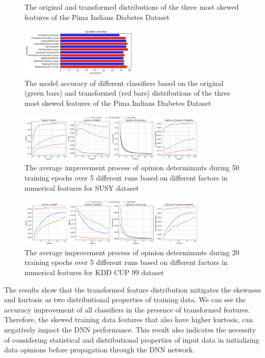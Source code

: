 {\begin{figure}[t]
\vspace{-0.3cm}
\caption{The original and transformed distributions of the three most skewed features of the Pima Indians Diabetes Dataset}
\label{skew_dist}
\end{figure}
\begin{figure}[t]  %
\centering
\includegraphics[width=0.5\textwidth]{figures/classifiers.pdf}
\vspace{-0.7cm}
\caption{The model accuracy of different classifiers based on the original (green bars) and transformed (red bars) distributions of the three most skewed features of the Pima Indians Diabetes Dataset}
\label{skew_acc}
\end{figure}

\begin{figure}[!ht]  %
	\centering %
	\includegraphics[width=0.8\textwidth]{figures/Results_Op_susy.pdf}
	\vspace{-0.3cm}
	\caption{The average improvement process of opinion determinants during 50 training epochs over 5 different runs based on different factors in numerical features for SUSY dataset}
\label{susy_op}
\end{figure}
\begin{figure}[!ht]
	\centering %
	\includegraphics[width=0.8\textwidth]{figures/Results_Op_kdd.pdf}
	\vspace{-0.3cm}
	\caption{The average improvement process of opinion determinants during 20 training epochs over 5 different runs based on different factors in numerical features for KDD CUP 99 dataset}
\label{kdd_op}
\end{figure}

The results show that the transformed feature distribution mitigates the skewness and kurtosis as two distributional properties of training data. We can see the accuracy improvement of all classifiers in the presence of transformed features. Therefore, the skewed training data features that also have higher kurtosis, can negatively impact the DNN performance. This result also indicates the necessity of considering statistical and distributional properties of input data in initializing data opinions before propagation through the DNN network.
}

